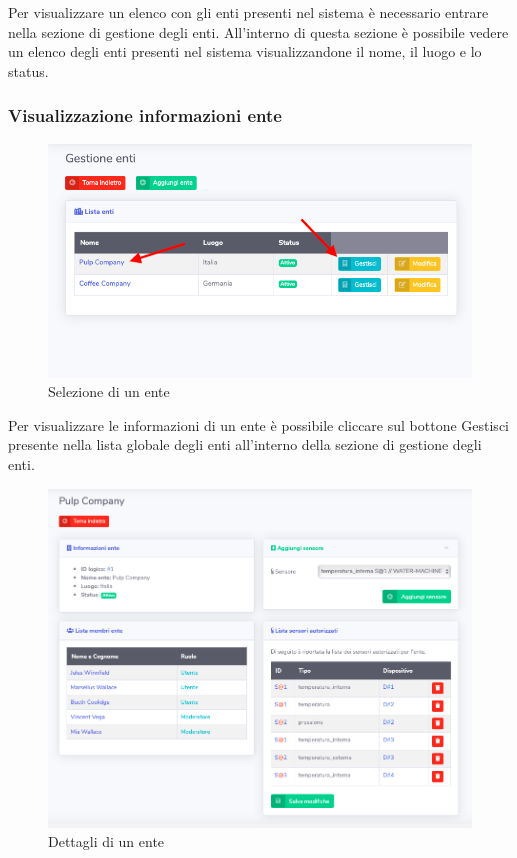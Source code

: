 		Per visualizzare un elenco con gli enti presenti nel sistema è necessario entrare nella sezione di gestione degli enti. All'interno di questa sezione è possibile vedere un elenco degli enti presenti nel sistema visualizzandone il nome, il luogo e lo status.			

	\subsubsection{Visualizzazione informazioni ente}

		\begin{figure}[H]
		\centering
		\includegraphics[scale=0.600]{res/images/admin/selDettEnte.png}
		\caption{Selezione di un ente}
	\end{figure}

		Per visualizzare le informazioni di un ente è possibile cliccare sul bottone Gestisci presente nella lista globale degli enti all'interno della sezione di gestione degli enti. 

		\begin{figure}[H]
		\centering
		\includegraphics[scale=0.600]{res/images/admin/dettEnte.png}
		\caption{Dettagli di un ente}
	\end{figure}

